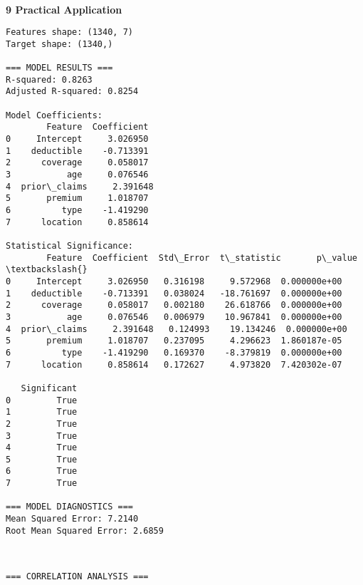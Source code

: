 \documentclass[8pt, twocolumn]{extarticle}
\begin{document}
    \begin{center}
    \end{center}
    { \hspace*{\fill} \\}
    \textbf{9 Practical Application}
    \begin{Verbatim}[commandchars=\\\{\}]
Features shape: (1340, 7)
Target shape: (1340,)

=== MODEL RESULTS ===
R-squared: 0.8263
Adjusted R-squared: 0.8254

Model Coefficients:
        Feature  Coefficient
0     Intercept     3.026950
1    deductible    -0.713391
2      coverage     0.058017
3           age     0.076546
4  prior\_claims     2.391648
5       premium     1.018707
6          type    -1.419290
7      location     0.858614

Statistical Significance:
        Feature  Coefficient  Std\_Error  t\_statistic       p\_value  \textbackslash{}
0     Intercept     3.026950   0.316198     9.572968  0.000000e+00
1    deductible    -0.713391   0.038024   -18.761697  0.000000e+00
2      coverage     0.058017   0.002180    26.618766  0.000000e+00
3           age     0.076546   0.006979    10.967841  0.000000e+00
4  prior\_claims     2.391648   0.124993    19.134246  0.000000e+00
5       premium     1.018707   0.237095     4.296623  1.860187e-05
6          type    -1.419290   0.169370    -8.379819  0.000000e+00
7      location     0.858614   0.172627     4.973820  7.420302e-07

   Significant
0         True
1         True
2         True
3         True
4         True
5         True
6         True
7         True

=== MODEL DIAGNOSTICS ===
Mean Squared Error: 7.2140
Root Mean Squared Error: 2.6859
    \end{Verbatim}
    \begin{center}
    \end{center}
    { \hspace*{\fill} \\}
    \begin{Verbatim}[commandchars=\\\{\}]
=== CORRELATION ANALYSIS ===
    \end{Verbatim}
    \begin{center}
    \end{center}
\end{document}
